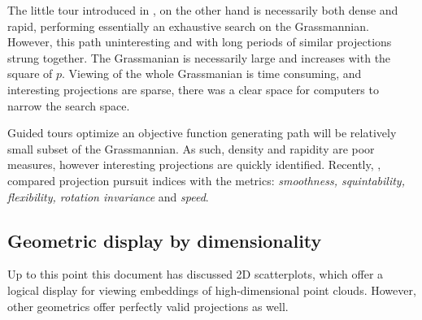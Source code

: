 \documentclass{monashthesis}
\begin{document}
The little tour introduced in \textcite{mcdonald_interactive_1982}, on
the other hand is necessarily both dense and rapid, performing
essentially an exhaustive search on the Grassmannian. However, this path
uninteresting and with long periods of similar projections strung
together. The Grassmanian is necessarily large and increases with the
square of \(p\). Viewing of the whole Grassmanian is time consuming, and
interesting projections are sparse, there was a clear space for
computers to narrow the search space.

Guided tours \autocite{hurley_analyzing_1990} optimize an objective
function generating path will be relatively small subset of the
Grassmannian. As such, density and rapidity are poor measures, however
interesting projections are quickly identified. Recently,
\textcite{laa_using_2019}, compared projection pursuit indices with the
metrics: \emph{smoothness, squintability, flexibility, rotation
invariance} and \emph{speed}.

\subsection{Geometric display by
dimensionality}\label{geometric-display-by-dimensionality}

Up to this point this document has discussed 2D scatterplots, which
offer a logical display for viewing embeddings of high-dimensional point
clouds. However, other geometrics offer perfectly valid projections as
well.
\end{document}
